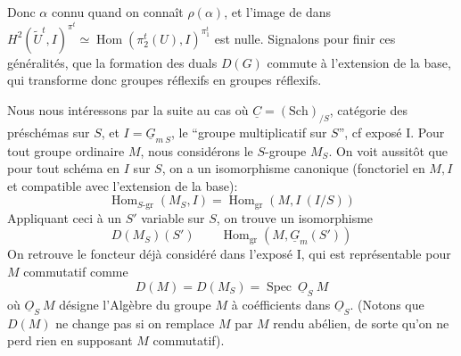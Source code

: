 
 Donc $\alpha$ connu quand on connaît $\rho(\alpha)$, et l'image de  dans $H^2(\widetilde U^t,I)^{\pi^t}\simeq\operatorname{Hom}(\pi_{2}^t(U),I)^{\pi_1^t}$ est nulle.
Signalons pour finir ces généralités, que la formation des duals $D(G)$ commute à l'extension de la base, qui transforme donc groupes réflexifs en groupes réflexifs.

Nous nous intéressons par la suite au cas où $\underline C=(\mathrm{Sch})_{/S}$, catégorie des préschémas sur $S$, et $I=\underline G_{m\ S}$, le ``groupe multiplicatif sur $S$'', cf exposé I. Pour tout groupe  ordinaire $M$, nous considérons le $S$-groupe $M_S$. On voit aussitôt que pour tout schéma en  $I$ sur $S$, on a un isomorphisme canonique (fonctoriel en $M,I$ et compatible avec l'extension de la base):
\[
 \operatorname{Hom}_{S\text{-gr}}(M_S,I)=\operatorname{Hom}_{\mathrm{gr}}(M,I\ (I/S))
\]
Appliquant ceci à un $S'$ variable sur $S$, on trouve un isomorphisme 
\[
 D(M_S)(S')\qquad \operatorname{Hom}_{\mathrm{gr}}(M,\underline G_m(S'))
\]
On retrouve le foncteur déjà considéré dans l'exposé I,  qui est représentable  pour $M$ commutatif comme
\[
 D(M)=D(M_S)=\operatorname{Spec}\ \underline O_S\ M
\]
où $\underline O_S\ M$ désigne l'Algèbre du groupe $M$ à coéfficients dans $\underline O_S$. (Notons  que $D(M)$ ne change pas si on remplace $M$ par $M$ rendu  abélien, de sorte  qu'on ne perd rien en supposant $M$ commutatif).

